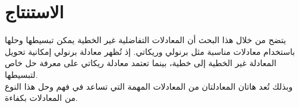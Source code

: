 \chapter*{الاستنتاج}
يتضح من خلال هذا البحث أن المعادلات التفاضلية غير الخطية يمكن تبسيطها وحلها باستخدام معادلات مناسبة مثل برنولي وريكاتي. إذ تُظهر معادلة برنولي إمكانية تحويل المعادلة غير الخطية إلى خطية، بينما تعتمد معادلة ريكاتي على معرفة حل خاص لتبسيطها. \\
وبذلك تُعد هاتان المعادلتان من المعادلات المهمة التي تساعد في فهم وحل هذا النوع من المعادلات بكفاءة.